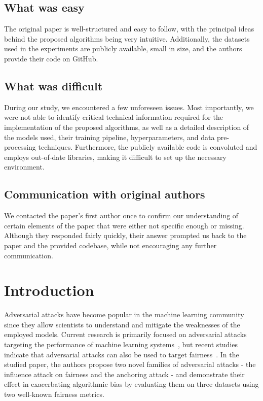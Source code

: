 \subsection*{What was easy}
The original paper is well-structured and easy to follow, with the principal ideas behind the proposed algorithms being very intuitive. Additionally, the datasets used in the experiments are publicly available, small in size, and the authors provide their code on GitHub.

\subsection*{What was difficult}
During our study, we encountered a few unforeseen issues. Most importantly, we were not able to identify critical technical information required for the implementation of the proposed algorithms, as well as a detailed description of the models used, their training pipeline, hyperparameters, and data pre-processing techniques. Furthermore, the publicly available code is convoluted and employs out-of-date libraries, making it difficult to set up the necessary environment.

\subsection*{Communication with original authors}
We contacted the paper's first author once to confirm our understanding of certain elements of the paper that were either not specific enough or missing. Although they responded fairly quickly, their answer prompted us back to the paper and the provided codebase, while not encouraging any further communication.

\pagebreak

\section{Introduction}
Adversarial attacks have become popular in the machine learning community since they allow scientists to understand and mitigate the weaknesses of the employed models. Current research is primarily focused on adversarial attacks targeting the performance of machine learning systems~\cite{survey-chakraborty, survey-li}, but recent studies indicate that adversarial attacks can also be used to target fairness~\cite{mehrabi2021exacerbating, nanda2021fairness, solans2020poisoning}. In the studied paper, the authors propose two novel families of adversarial attacks - the influence attack on fairness and the anchoring attack - and demonstrate their effect in exacerbating algorithmic bias by evaluating them on three datasets using two well-known fairness metrics.


